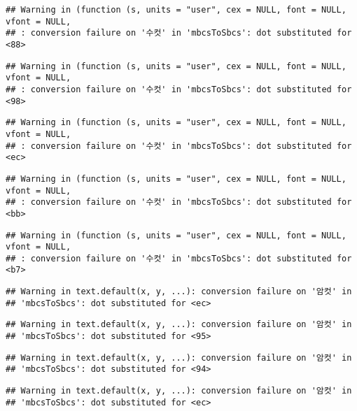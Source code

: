 \documentclass[
]{article}
\begin{document}
\begin{verbatim}
## Warning in (function (s, units = "user", cex = NULL, font = NULL, vfont = NULL,
## : conversion failure on '수컷' in 'mbcsToSbcs': dot substituted for <88>
\end{verbatim}

\begin{verbatim}
## Warning in (function (s, units = "user", cex = NULL, font = NULL, vfont = NULL,
## : conversion failure on '수컷' in 'mbcsToSbcs': dot substituted for <98>
\end{verbatim}

\begin{verbatim}
## Warning in (function (s, units = "user", cex = NULL, font = NULL, vfont = NULL,
## : conversion failure on '수컷' in 'mbcsToSbcs': dot substituted for <ec>
\end{verbatim}

\begin{verbatim}
## Warning in (function (s, units = "user", cex = NULL, font = NULL, vfont = NULL,
## : conversion failure on '수컷' in 'mbcsToSbcs': dot substituted for <bb>
\end{verbatim}

\begin{verbatim}
## Warning in (function (s, units = "user", cex = NULL, font = NULL, vfont = NULL,
## : conversion failure on '수컷' in 'mbcsToSbcs': dot substituted for <b7>
\end{verbatim}

\begin{verbatim}
## Warning in text.default(x, y, ...): conversion failure on '암컷' in
## 'mbcsToSbcs': dot substituted for <ec>
\end{verbatim}

\begin{verbatim}
## Warning in text.default(x, y, ...): conversion failure on '암컷' in
## 'mbcsToSbcs': dot substituted for <95>
\end{verbatim}

\begin{verbatim}
## Warning in text.default(x, y, ...): conversion failure on '암컷' in
## 'mbcsToSbcs': dot substituted for <94>
\end{verbatim}

\begin{verbatim}
## Warning in text.default(x, y, ...): conversion failure on '암컷' in
## 'mbcsToSbcs': dot substituted for <ec>
\end{verbatim}
\end{document}
